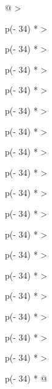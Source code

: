 \begin{longtable}[]{@{}
  >{\raggedright\arraybackslash}p{(\columnwidth - 34\tabcolsep) * }
  >{\raggedright\arraybackslash}p{(\columnwidth - 34\tabcolsep) * }
  >{\raggedright\arraybackslash}p{(\columnwidth - 34\tabcolsep) * }
  >{\raggedright\arraybackslash}p{(\columnwidth - 34\tabcolsep) * }
  >{\raggedright\arraybackslash}p{(\columnwidth - 34\tabcolsep) * }
  >{\raggedright\arraybackslash}p{(\columnwidth - 34\tabcolsep) * }
  >{\raggedright\arraybackslash}p{(\columnwidth - 34\tabcolsep) * }
  >{\raggedright\arraybackslash}p{(\columnwidth - 34\tabcolsep) * }
  >{\raggedright\arraybackslash}p{(\columnwidth - 34\tabcolsep) * }
  >{\raggedright\arraybackslash}p{(\columnwidth - 34\tabcolsep) * }
  >{\raggedright\arraybackslash}p{(\columnwidth - 34\tabcolsep) * }
  >{\raggedright\arraybackslash}p{(\columnwidth - 34\tabcolsep) * }
  >{\raggedright\arraybackslash}p{(\columnwidth - 34\tabcolsep) * }
  >{\raggedright\arraybackslash}p{(\columnwidth - 34\tabcolsep) * }
  >{\raggedright\arraybackslash}p{(\columnwidth - 34\tabcolsep) * }
  >{\raggedright\arraybackslash}p{(\columnwidth - 34\tabcolsep) * }
  >{\raggedright\arraybackslash}p{(\columnwidth - 34\tabcolsep) * }
  >{\raggedright\arraybackslash}p{(\columnwidth - 34\tabcolsep) * }@{}}
\toprule\noalign{}
\endhead
\bottomrule\noalign{}
\endlastfoot
{} \\
 \\
\begin{minipage}[t]{\linewidth}\raggedright


\end{minipage}
\end{longtable}
